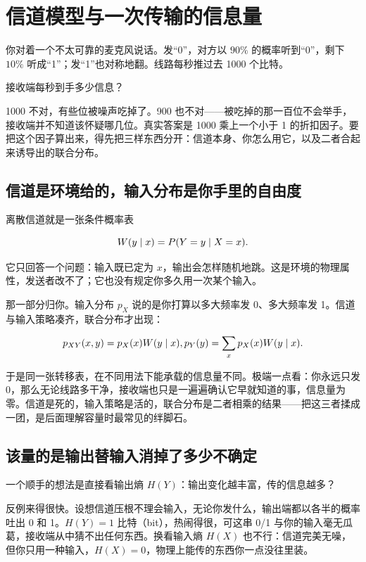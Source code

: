 \section{信道模型与一次传输的信息量}
\label{sec:07-Information-Theory/05-Channel-Coding/01}

你对着一个不太可靠的麦克风说话。发``0''，对方以 \(90\%\) 的概率听到``0''，剩下 \(10\%\) 听成``1''；发``1''也对称地翻。线路每秒推过去 1000 个比特。

接收端每秒到手多少信息？

1000 不对，有些位被噪声吃掉了。900 也不对——被吃掉的那一百位不会举手，接收端并不知道该怀疑哪几位。真实答案是 1000 乘上一个小于 1 的折扣因子。要把这个因子算出来，得先把三样东西分开：信道本身、你怎么用它，以及二者合起来诱导出的联合分布。

\subsection{信道是环境给的，输入分布是你手里的自由度}

离散信道就是一张条件概率表

\[
W(y\mid x)=P(Y=y\mid X=x).
\]

它只回答一个问题：输入既已定为 \(x\)，输出会怎样随机地跳。这是环境的物理属性，发送者改不了；它也没有规定你多久用一次某个输入。

那一部分归你。输入分布 \(p_X\) 说的是你打算以多大频率发 0、多大频率发 1。信道与输入策略凑齐，联合分布才出现：

\[
p_{XY}(x,y)=p_X(x)W(y\mid x),\space
p_Y(y)=\sum_x p_X(x)W(y\mid x).
\]

于是同一张转移表，在不同用法下能承载的信息量不同。极端一点看：你永远只发 0，那么无论线路多干净，接收端也只是一遍遍确认它早就知道的事，信息量为零。信道是死的，输入策略是活的，联合分布是二者相乘的结果——把这三者揉成一团，是后面理解容量时最常见的绊脚石。

\subsection{该量的是输出替输入消掉了多少不确定}

一个顺手的想法是直接看输出熵 \(H(Y)\)：输出变化越丰富，传的信息越多？

反例来得很快。设想信道压根不理会输入，无论你发什么，输出端都以各半的概率吐出 0 和 1。\(H(Y)=1\) 比特（bit），热闹得很，可这串 0/1 与你的输入毫无瓜葛，接收端从中猜不出任何东西。换看输入熵 \(H(X)\) 也不行：信道完美无噪，但你只用一种输入，\(H(X)=0\)，物理上能传的东西你一点没往里装。

